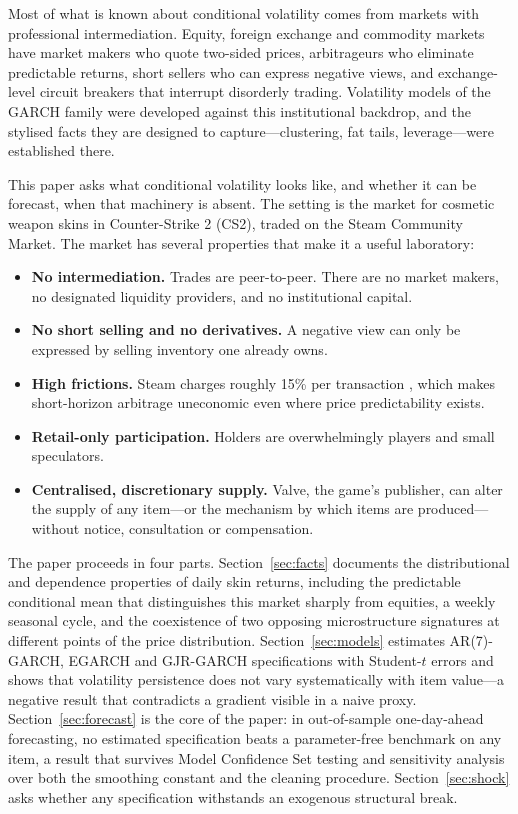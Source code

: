 \documentclass[11pt,a4paper]{article}
\begin{document}
Most of what is known about conditional volatility comes from markets with
professional intermediation. Equity, foreign exchange and commodity markets
have market makers who quote two-sided prices, arbitrageurs who eliminate
predictable returns, short sellers who can express negative views, and
exchange-level circuit breakers that interrupt disorderly trading. Volatility
models of the GARCH family \citep{Engle1982,Bollerslev1986} were developed
against this institutional backdrop, and the stylised facts they are designed
to capture---clustering, fat tails, leverage---were established there.

This paper asks what conditional volatility looks like, and whether it can be
forecast, when that machinery is absent. The setting is the market for
cosmetic weapon skins in Counter-Strike 2 (CS2), traded on the Steam Community
Market. The market has several properties that make it a useful laboratory:

\begin{itemize}
\item \textbf{No intermediation.} Trades are peer-to-peer. There are no market
makers, no designated liquidity providers, and no institutional capital.
\item \textbf{No short selling and no derivatives.} A negative view can only be
expressed by selling inventory one already owns.
\item \textbf{High frictions.} Steam charges roughly 15\% per transaction
\citep{Dobrynskaya2025}, which makes short-horizon arbitrage uneconomic even
where price predictability exists.
\item \textbf{Retail-only participation.} Holders are overwhelmingly players
and small speculators.
\item \textbf{Centralised, discretionary supply.} Valve, the game's publisher,
can alter the supply of any item---or the mechanism by which items are
produced---without notice, consultation or compensation.
\end{itemize}

\noindent
The paper proceeds in four parts. Section~\ref{sec:facts} documents the
distributional and dependence properties of daily skin returns, including the
predictable conditional mean that distinguishes this market sharply from
equities, a weekly seasonal cycle, and the coexistence of two opposing
microstructure signatures at different points of the price distribution.
Section~\ref{sec:models} estimates AR(7)-GARCH, EGARCH and GJR-GARCH
specifications with Student-$t$ errors and shows that volatility persistence
does not vary systematically with item value---a negative result that
contradicts a gradient visible in a naive proxy.
Section~\ref{sec:forecast} is the core of the paper: in out-of-sample
one-day-ahead forecasting, no estimated specification beats a parameter-free
benchmark on any item, a result that survives Model Confidence Set testing and
sensitivity analysis over both the smoothing constant and the cleaning
procedure. Section~\ref{sec:shock} asks whether any specification withstands
an exogenous structural break.
\end{document}
